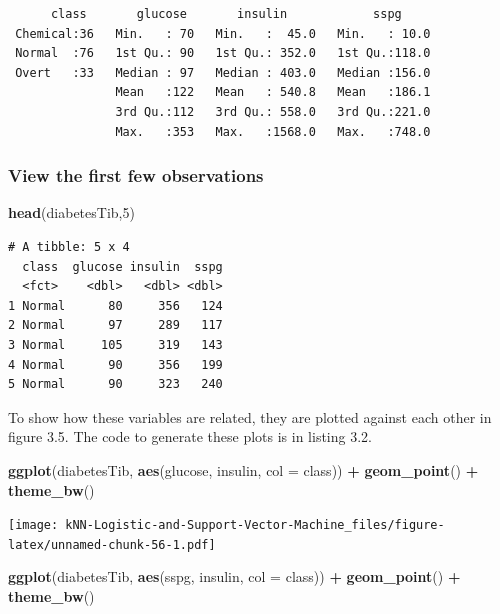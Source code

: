 \documentclass[
]{article}
\newenvironment{Shaded}{\begin{snugshade}}{\end{snugshade}}
\newcommand{\AttributeTok}[1]{\textcolor[rgb]{0.13,0.29,0.53}{#1}}
\newcommand{\DecValTok}[1]{\textcolor[rgb]{0.00,0.00,0.81}{#1}}
\newcommand{\FunctionTok}[1]{\textcolor[rgb]{0.13,0.29,0.53}{\textbf{#1}}}
\newcommand{\NormalTok}[1]{#1}
\newcommand{\SpecialCharTok}[1]{\textcolor[rgb]{0.81,0.36,0.00}{\textbf{#1}}}
\begin{document}
\begin{verbatim}
      class       glucose       insulin            sspg      
 Chemical:36   Min.   : 70   Min.   :  45.0   Min.   : 10.0  
 Normal  :76   1st Qu.: 90   1st Qu.: 352.0   1st Qu.:118.0  
 Overt   :33   Median : 97   Median : 403.0   Median :156.0  
               Mean   :122   Mean   : 540.8   Mean   :186.1  
               3rd Qu.:112   3rd Qu.: 558.0   3rd Qu.:221.0  
               Max.   :353   Max.   :1568.0   Max.   :748.0  
\end{verbatim}

\subsubsection{View the first few
observations}\label{view-the-first-few-observations}

\begin{Shaded}
\begin{Highlighting}[]
\FunctionTok{head}\NormalTok{(diabetesTib,}\DecValTok{5}\NormalTok{)}
\end{Highlighting}
\end{Shaded}

\begin{verbatim}
# A tibble: 5 x 4
  class  glucose insulin  sspg
  <fct>    <dbl>   <dbl> <dbl>
1 Normal      80     356   124
2 Normal      97     289   117
3 Normal     105     319   143
4 Normal      90     356   199
5 Normal      90     323   240
\end{verbatim}

To show how these variables are related, they are plotted against each
other in figure 3.5. The code to generate these plots is in listing 3.2.

\begin{Shaded}
\begin{Highlighting}[]
\FunctionTok{ggplot}\NormalTok{(diabetesTib, }\FunctionTok{aes}\NormalTok{(glucose, insulin, }\AttributeTok{col =}\NormalTok{ class)) }\SpecialCharTok{+}
  \FunctionTok{geom\_point}\NormalTok{() }\SpecialCharTok{+}
  \FunctionTok{theme\_bw}\NormalTok{()}
\end{Highlighting}
\end{Shaded}

\texttt{[image: kNN-Logistic-and-Support-Vector-Machine\_files/figure-latex/unnamed-chunk-56-1.pdf]}

\begin{Shaded}
\begin{Highlighting}[]
\FunctionTok{ggplot}\NormalTok{(diabetesTib, }\FunctionTok{aes}\NormalTok{(sspg, insulin, }\AttributeTok{col =}\NormalTok{ class)) }\SpecialCharTok{+}
  \FunctionTok{geom\_point}\NormalTok{() }\SpecialCharTok{+}
  \FunctionTok{theme\_bw}\NormalTok{()}
\end{Highlighting}
\end{Shaded}
\end{document}
